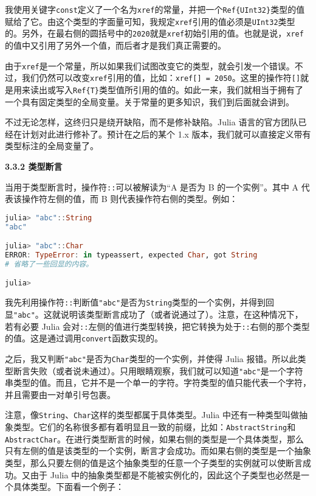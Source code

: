 我使用关键字\verb|const|定义了一个名为\verb|xref|的常量，并把一个\verb|Ref{UInt32}|类型的值赋给了它。由这个类型的字面量可知，我规定\verb|xref|引用的值必须是\verb|UInt32|类型的。另外，在最右侧的圆括号中的\verb|2020|就是\verb|xref|初始引用的值。也就是说，\verb|xref|的值中又引用了另外一个值，而后者才是我们真正需要的。

由于\verb|xref|是一个常量，所以如果我们试图改变它的类型，就会引发一个错误。不过，我们仍然可以改变\verb|xref|引用的值，比如：\verb|xref[] = 2050|。这里的操作符\verb|[]|就是用来读出或写入\verb|Ref{T}|类型值所引用的值的。如此一来，我们就相当于拥有了一个具有固定类型的全局变量。关于常量的更多知识，我们到后面就会讲到。

不过无论怎样，这终归只是绕开缺陷，而不是修补缺陷。Julia 语言的官方团队已经在计划对此进行修补了。预计在之后的某个 1.x 版本，我们就可以直接定义带有类型标注的全局变量了。

\textbf{3.3.2 类型断言}

当用于类型断言时，操作符\verb|::|可以被解读为“A 是否为 B 的一个实例”。其中 A 代表该操作符左侧的值，而 B 则代表操作符右侧的类型。例如：

\begin{lstlisting}[language=julia]
julia> "abc"::String
"abc"

julia> "abc"::Char
ERROR: TypeError: in typeassert, expected Char, got String
# 省略了一些回显的内容。

julia> 
\end{lstlisting}

我先利用操作符\verb|::|判断值\verb|"abc"|是否为\verb|String|类型的一个实例，并得到回显\verb|"abc"|。这就说明该类型断言成功了（或者说通过了）。注意，在这种情况下，若有必要 Julia 会对\verb|::|左侧的值进行类型转换，把它转换为处于\verb|::|右侧的那个类型的值。这是通过调用\verb|convert|函数实现的。

之后，我又判断\verb|"abc"|是否为\verb|Char|类型的一个实例，并使得 Julia 报错。所以此类型断言失败（或者说未通过）。只用眼睛观察，我们就可以知道\verb|"abc"|是一个字符串类型的值。而且，它并不是一个单一的字符。字符类型的值只能代表一个字符，并且需要由一对单引号包裹。

注意，像\verb|String|、\verb|Char|这样的类型都属于具体类型。Julia 中还有一种类型叫做抽象类型。它们的名称很多都有着明显且一致的前缀，比如：\verb|AbstractString|和\verb|AbstractChar|。在进行类型断言的时候，如果右侧的类型是一个具体类型，那么只有左侧的值是该类型的一个实例，断言才会成功。而如果右侧的类型是一个抽象类型，那么只要左侧的值是这个抽象类型的任意一个子类型的实例就可以使断言成功。又由于 Julia 中的抽象类型都是不能被实例化的，因此这个子类型也必然是一个具体类型。下面看一个例子：

